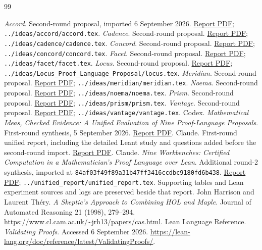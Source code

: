 \documentclass[11pt,letterpaper]{article}
\newcommand{\code}[1]{\nolinkurl{#1}}
\begin{document}
\clearpage
\begingroup\small
\begin{thebibliography}{99}
 \emph{Accord}. Second-round proposal, imported 6 September 2026.
\href{../ideas/accord/accord.pdf}{Report PDF}; \code{../ideas/accord/accord.tex}.
 \emph{Cadence}. Second-round proposal.
\href{../ideas/cadence/cadence.pdf}{Report PDF}; \code{../ideas/cadence/cadence.tex}.
 \emph{Concord}. Second-round proposal.
\href{../ideas/concord/concord.pdf}{Report PDF}; \code{../ideas/concord/concord.tex}.
 \emph{Facet}. Second-round proposal.
\href{../ideas/facet/facet.pdf}{Report PDF}; \code{../ideas/facet/facet.tex}.
 \emph{Locus}. Second-round proposal.
\href{../ideas/Locus_Proof_Language_Proposal/locus.pdf}{Report PDF};
\code{../ideas/Locus_Proof_Language_Proposal/locus.tex}.
 \emph{Meridian}. Second-round proposal.
\href{../ideas/meridian/meridian.pdf}{Report PDF}; \code{../ideas/meridian/meridian.tex}.
 \emph{Noema}. Second-round proposal.
\href{../ideas/noema/noema.pdf}{Report PDF}; \code{../ideas/noema/noema.tex}.
 \emph{Prism}. Second-round proposal.
\href{../ideas/prism/prism.pdf}{Report PDF}; \code{../ideas/prism/prism.tex}.
 \emph{Vantage}. Second-round proposal.
\href{../ideas/vantage/vantage.pdf}{Report PDF}; \code{../ideas/vantage/vantage.tex}.
 Codex. \emph{Mathematical Ideas, Checked Evidence: A Unified
Evaluation of Nine Proof-Language Proposals}. First-round synthesis,
5 September 2026.
\href{../../round-1/synthesis/unified-report.pdf}{Report PDF}.
 Claude. First-round unified report, including the detailed
Leant study and questions added before the second-round import.
\href{../../round-1/unified_report/unified_report.pdf}{Report PDF}.
 Claude. \emph{Nine Workbenches: Certified Computation in a
Mathematician's Proof Language over Lean}. Additional round-2 synthesis, imported
at \code{84af03f49f89a31b47ff3416ccdbc9180fd6b438}.
\href{../unified_report/unified_report.pdf}{Report PDF};
\code{../unified_report/unified_report.tex}. Supporting tables and Lean
experiment sources and logs are preserved beside that report.
 John Harrison and Laurent Th\'ery.
\emph{A Skeptic's Approach to Combining HOL and Maple}.
Journal of Automated Reasoning 21 (1998), 279--294.
\url{https://www.cl.cam.ac.uk/~jrh13/papers/cas.html}.
 Lean Language Reference. \emph{Validating Proofs}.
Accessed 6 September 2026.
\url{https://lean-lang.org/doc/reference/latest/ValidatingProofs/}.
\end{thebibliography}
\endgroup
\end{document}
